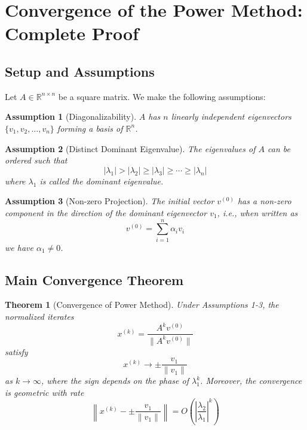 \documentclass[12pt]{article}
\newtheorem{theorem}{Theorem}
\newtheorem{assumption}{Assumption}
\begin{document}
\section*{Convergence of the Power Method: Complete Proof}

\subsection*{Setup and Assumptions}

Let $A \in \mathbb{R}^{n \times n}$ be a square matrix. We make the following assumptions:

\begin{assumption}[Diagonalizability]
$A$ has $n$ linearly independent eigenvectors $\{v_1, v_2, \ldots, v_n\}$ forming a basis of $\mathbb{R}^n$.
\end{assumption}

\begin{assumption}[Distinct Dominant Eigenvalue]
The eigenvalues of $A$ can be ordered such that
\begin{equation}
|\lambda_1| > |\lambda_2| \geq |\lambda_3| \geq \cdots \geq |\lambda_n|
\end{equation}
where $\lambda_1$ is called the \emph{dominant eigenvalue}.
\end{assumption}

\begin{assumption}[Non-zero Projection]
The initial vector $v^{(0)}$ has a non-zero component in the direction of the dominant eigenvector $v_1$, i.e., when written as
\begin{equation}
v^{(0)} = \sum_{i=1}^{n} \alpha_i v_i
\end{equation}
we have $\alpha_1 \neq 0$.
\end{assumption}

\subsection*{Main Convergence Theorem}

\begin{theorem}[Convergence of Power Method]
Under Assumptions 1-3, the normalized iterates
\begin{equation}
x^{(k)} = \frac{A^k v^{(0)}}{\|A^k v^{(0)}\|}
\end{equation}
satisfy
\begin{equation}
x^{(k)} \to \pm \frac{v_1}{\|v_1\|}
\end{equation}
as $k \to \infty$, where the sign depends on the phase of $\lambda_1^k$. Moreover, the convergence is geometric with rate
\begin{equation}
\left\| x^{(k)} - \pm \frac{v_1}{\|v_1\|} \right\| = O\left(\left|\frac{\lambda_2}{\lambda_1}\right|^k\right)
\end{equation}
\end{theorem}
\end{document}
